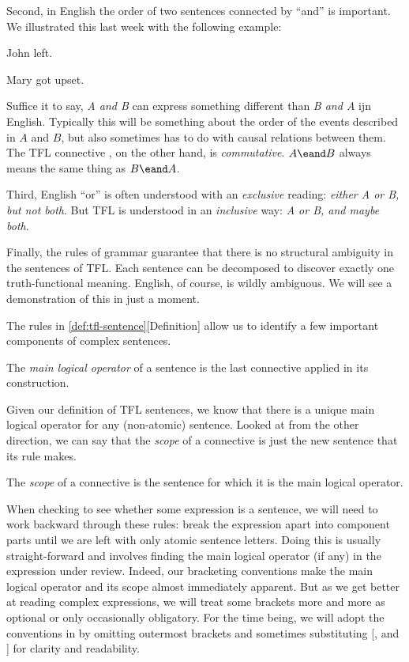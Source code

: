 Second, in English the order of two sentences connected by ``and'' is important.
We illustrated this last week with the following example:

\begin{argument}
\item[A:] John left.
\item[B:] Mary got upset.
\end{argument}

Suffice it to say, \emph{A and B} can express something different than
\emph{B and A} ijn English. Typically this will be something about the order
of the events described in $A$ and $B$, but also sometimes has to do with
causal relations between them. The TFL connective \eand, on the other hand,
is \emph{commutative}. $A\eand B$ always means the same thing as $B\eand A$.

Third, English ``or'' is often understood with an \emph{exclusive} reading:
\emph{either A or B, but not both}. But TFL \eor is understood in an
\emph{inclusive} way: \emph{A or B, and maybe both}.

Finally, the rules of grammar guarantee that there is no structural ambiguity
in the sentences of TFL. Each sentence can be decomposed to discover exactly
one truth-functional meaning. English, of course, is wildly ambiguous. We will
see a demonstration of this in just a moment.

The rules in \ref{def:tfl-sentence}[Definition] allow us to identify a few
important components of complex sentences.

\begin{definition}
  \label{def:tfl-main-operator}
  The \emph{main logical operator} of a sentence is the last connective applied
  in its construction.
\end{definition}

Given our definition of TFL sentences, we know that there is a unique main
logical operator for any (non-atomic) sentence. Looked at from the other
direction, we can say that the \emph{scope} of a connective is just the new
sentence that its rule makes.

\begin{definition}
  \label{def:tfl-connective-scope}
  The \emph{scope} of a connective is the sentence for which it is the main
  logical operator.
\end{definition}

When checking to see whether some expression is a sentence, we will need to work
backward through these rules: break the expression apart into component parts
until we are left with only atomic sentence letters. Doing this is usually
straight-forward and involves finding the main logical operator (if any) in
the expression under review. Indeed, our bracketing conventions make the main
logical operator and its scope almost immediately apparent. But as we get
better at reading complex expressions, we will treat some brackets more and
more as optional or only occasionally obligatory. For the time being, we will
adopt the conventions in \cite{Mag25} by omitting outermost brackets and
sometimes substituting [, and ] for clarity and readability.

